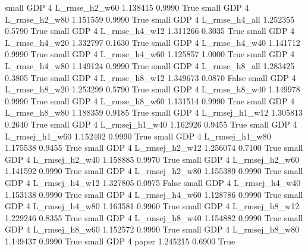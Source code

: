     small      GDP                 4  L_rmse_h2_w60   1.138415      0.9990    True
     small      GDP                 4  L_rmse_h2_w80   1.151559      0.9990    True
     small      GDP                 4  L_rmse_h4_all   1.252355      0.5790    True
     small      GDP                 4  L_rmse_h4_w12   1.311266      0.3035    True
     small      GDP                 4  L_rmse_h4_w20   1.332797      0.1630    True
     small      GDP                 4  L_rmse_h4_w40   1.141712      0.9990    True
     small      GDP                 4  L_rmse_h4_w60   1.125857      1.0000    True
     small      GDP                 4  L_rmse_h4_w80   1.149124      0.9990    True
     small      GDP                 4  L_rmse_h8_all   1.283425      0.3805    True
     small      GDP                 4  L_rmse_h8_w12   1.349673      0.0870   False
     small      GDP                 4  L_rmse_h8_w20   1.253299      0.5790    True
     small      GDP                 4  L_rmse_h8_w40   1.149978      0.9990    True
     small      GDP                 4  L_rmse_h8_w60   1.131514      0.9990    True
     small      GDP                 4  L_rmse_h8_w80   1.188359      0.9185    True
     small      GDP                 4 L_rmsej_h1_w12   1.305813      0.2640    True
     small      GDP                 4 L_rmsej_h1_w40   1.162926      0.9455    True
     small      GDP                 4 L_rmsej_h1_w60   1.152402      0.9990    True
     small      GDP                 4 L_rmsej_h1_w80   1.175538      0.9455    True
     small      GDP                 4 L_rmsej_h2_w12   1.256074      0.7100    True
     small      GDP                 4 L_rmsej_h2_w40   1.158885      0.9970    True
     small      GDP                 4 L_rmsej_h2_w60   1.141592      0.9990    True
     small      GDP                 4 L_rmsej_h2_w80   1.155389      0.9990    True
     small      GDP                 4 L_rmsej_h4_w12   1.327805      0.0975   False
     small      GDP                 4 L_rmsej_h4_w40   1.153138      0.9990    True
     small      GDP                 4 L_rmsej_h4_w60   1.128786      0.9990    True
     small      GDP                 4 L_rmsej_h4_w80   1.163581      0.9960    True
     small      GDP                 4 L_rmsej_h8_w12   1.229246      0.8355    True
     small      GDP                 4 L_rmsej_h8_w40   1.154882      0.9990    True
     small      GDP                 4 L_rmsej_h8_w60   1.152572      0.9990    True
     small      GDP                 4 L_rmsej_h8_w80   1.149437      0.9990    True
     small      GDP                 4          paper   1.245215      0.6900    True
